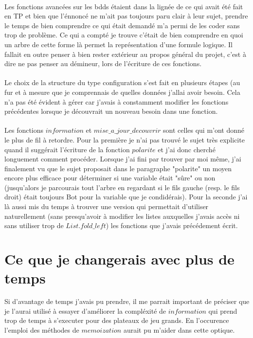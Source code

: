 \documentclass{report}
\begin{document}
	\paragraph{}
	Les fonctions avancées sur les bdds étaient dans la lignée de ce qui avait été fait en TP et bien que l'énnoncé ne m'ait pas toujours paru clair à leur sujet, prendre le temps de bien comprendre ce qui était demandé m'a permi de les coder sans trop de problème. Ce qui a compté je trouve c'était de bien comprendre en quoi un arbre de cette forme là permet la représentation d'une formule logique. Il fallait en outre penser à bien rester extérieur au propos général du projet, c'est à dire ne pas penser au démineur, lors de l'écriture de ces fonctions.
	\paragraph{}
	Le choix de la structure du type configuration s'est fait en plusieurs étapes (au fur et à mesure que je comprennais de quelles données j'allai avoir besoin. Cela n'a pas été évident à gérer car j'avais à constamment modifier les fonctions précédentes lorsque je découvrait un nouveau besoin dans une fonction.
	\paragraph{}
	Les fonctions $information$ et $mise\_a\_jour\_decouvrir$ sont celles qui m'ont donné le plus de fil à retordre. Pour la première je n'ai pas trouvé le sujet très explicite quand il suggérait l'écriture de la fonction $polarite$ et j'ai donc cherché longuement comment procéder. Lorsque j'ai fini par trouver par moi même, j'ai finalement vu que le sujet proposait dans le paragraphe "polarite" un moyen encore plus efficace pour déterminer si une variable était "sûre" ou non (jusqu'alors je parcourais tout l'arbre en regardant si le fils gauche (resp. le fils droit) était toujours Bot pour la variable que je condidérais). Pour la seconde j'ai là aussi mis du temps à trouver une version qui permettait d'utiliser naturellement (sans presqu'avoir à modifier les listes auxquelles j'avais accès ni sans utiliser trop de $List.fold\_left$) les fonctions que j'avais précédement écrit.

	\section{Ce que je changerais avec plus de temps}
	Si d'avantage de temps j'avais pu prendre, il me parrait important de préciser que je l'aurai utilisé à essayer d'améliorer la compléxité de $information$ qui prend trop de temps à s'executer pour des plateaux de jeu grands. En l'occurence l'emploi des méthodes de $memoization$ aurait pu m'aider dans cette optique.
	
\end{document}
